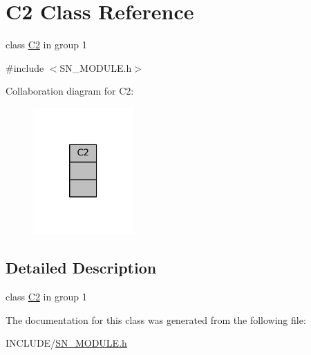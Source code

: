 \hypertarget{classC2}{}\section{C2 Class Reference}
\label{classC2}


class \hyperlink{classC2}{C2} in group 1  




{\ttfamily \#include $<$S\+N\+\_\+\+M\+O\+D\+U\+L\+E.\+h$>$}



Collaboration diagram for C2\+:
\nopagebreak
\begin{figure}[H]
\begin{center}
\leavevmode
\includegraphics[width=109pt]{classC2__coll__graph}
\end{center}
\end{figure}


\subsection{Detailed Description}
class \hyperlink{classC2}{C2} in group 1 

The documentation for this class was generated from the following file\+:\begin{DoxyCompactItemize}
\item 
I\+N\+C\+L\+U\+D\+E/\hyperlink{SN__MODULE_8h}{S\+N\+\_\+\+M\+O\+D\+U\+L\+E.\+h}\end{DoxyCompactItemize}
